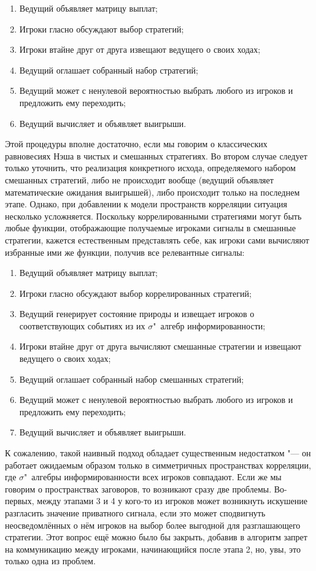 \begin{enumerate}
	\item Ведущий объявляет матрицу выплат;
	\item Игроки гласно обсуждают выбор стратегий;
	\item Игроки втайне друг от друга извещают ведущего о своих ходах;
	\item Ведущий оглашает собранный набор стратегий;
	\item Ведущий может с ненулевой вероятностью выбрать любого из игроков и предложить ему переходить;
	\item Ведущий вычисляет и объявляет выигрыши.
\end{enumerate}

Этой процедуры вполне достаточно, если мы говорим о классических равновесиях Нэша в чистых и смешанных стратегиях. Во втором случае следует только уточнить, что реализация конкретного исхода, определяемого набором смешанных стратегий, либо не происходит вообще (ведущий объявляет математические ожидания выигрышей), либо происходит только на последнем этапе. Однако, при добавлении к модели пространств корреляции ситуация несколько усложняется. Поскольку коррелированными стратегиями могут быть любые функции, отображающие получаемые игроками сигналы в смешанные стратегии, кажется естественным представлять себе, как игроки сами вычисляют избранные ими же функции, получив все релевантные сигналы:

\begin{enumerate}
	\item Ведущий объявляет матрицу выплат;
	\item Игроки гласно обсуждают выбор коррелированных стратегий;
	\item Ведущий генерирует состояние природы и извещает игроков о соответствующих событиях из их $\sigma$"~алгебр информированности;
	\item Игроки втайне друг от друга вычисляют смешанные стратегии и извещают ведущего о своих ходах;
	\item Ведущий оглашает собранный набор смешанных стратегий;
	\item Ведущий может с ненулевой вероятностью выбрать любого из игроков и предложить ему переходить;
	\item Ведущий вычисляет и объявляет выигрыши.
\end{enumerate}

К сожалению, такой наивный подход обладает существенным недостатком "--- он работает ожидаемым образом только в симметричных пространствах корреляции, где $\sigma$"~алгебры информированности всех игроков совпадают. Если же мы говорим о пространствах заговоров, то возникают сразу две проблемы. Во-первых, между этапами 3 и 4 у кого-то из игроков может возникнуть искушение разгласить значение приватного сигнала, если это может сподвигнуть неосведомлённых о нём игроков на выбор более выгодной для разглашающего стратегии. Этот вопрос ещё можно было бы закрыть, добавив в алгоритм запрет на коммуникацию между игроками, начинающийся после этапа 2, но, увы, это только одна из проблем.

